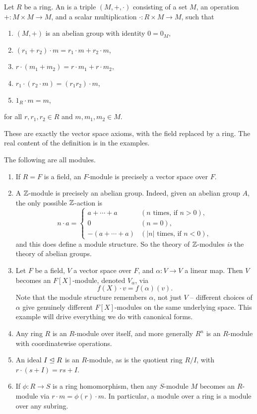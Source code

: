 \documentclass[a4paper]{scrartcl}
\begin{document}
\begin{definition}[Module]
	Let $R$ be a ring. An  is a triple $(M, +, \cdot)$ consisting of a set $M$, an operation $+ : M \times M \rightarrow M$, and a scalar multiplication $\cdot : R \times M \rightarrow M$, such that
	\begin{enumerate}[label=(\roman*)]
		\item $(M, +)$ is an abelian group with identity $0 = 0_M$,
		\item $(r_1 + r_2)\cdot m = r_1 \cdot m + r_2 \cdot m$,
		\item $r \cdot (m_1 + m_2) = r \cdot m_1 + r \cdot m_2$,
		\item $r_1 \cdot (r_2 \cdot m) = (r_1 r_2)\cdot m$,
		\item $1_R \cdot m = m$,
	\end{enumerate}
	for all $r, r_1, r_2 \in R$ and $m, m_1, m_2 \in M$.
\end{definition}

These are exactly the vector space axioms, with the field replaced by a ring. The real content of the definition is in the examples.

\begin{example}
	The following are all modules.
	\begin{enumerate}[label=(\roman*)]
		\item If $R = F$ is a field, an $F$-module is precisely a vector space over $F$.
		\item A $\mathbb{Z}$-module is precisely an abelian group. Indeed, given an abelian group $A$, the only possible $\mathbb{Z}$-action is
		$$
		n \cdot a = \begin{cases}
			a + \cdots + a & (n \text{ times, if } n > 0),\\
			0 & (n = 0), \\
			-(a + \cdots + a) & (|n| \text{ times, if } n < 0),
		\end{cases}
		$$
		and this does define a module structure. So the theory of $\mathbb{Z}$-modules \emph{is} the theory of abelian groups.
		\item Let $F$ be a field, $V$ a vector space over $F$, and $\alpha: V \rightarrow V$ a linear map. Then $V$ becomes an $F[X]$-module, denoted $V_{\alpha}$, via
		$$
		f(X) \cdot v = f(\alpha)(v).
		$$
		Note that the module structure remembers $\alpha$, not just $V$ -- different choices of $\alpha$ give genuinely different $F[X]$-modules on the same underlying space. This example will drive everything we do with canonical forms.
		\item Any ring $R$ is an $R$-module over itself, and more generally $R^n$ is an $R$-module with coordinatewise operations.
		\item An ideal $I \trianglelefteq R$ is an $R$-module, as is the quotient ring $R/I$, with $r \cdot (s + I) = rs + I$.
		\item If $\phi : R \rightarrow S$ is a ring homomorphism, then any $S$-module $M$ becomes an $R$-module via $r \cdot m = \phi(r) \cdot m$. In particular, a module over a ring is a module over any subring.
	\end{enumerate}
\end{example}
\end{document}
